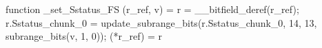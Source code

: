 function _set_Sstatus_FS (r_ref, v) = {
    r = __bitfield_deref(r_ref);
    r.Sstatus_chunk_0 = update_subrange_bits(r.Sstatus_chunk_0, 14, 13, subrange_bits(v, 1, 0));
    (*r_ref) = r
}
